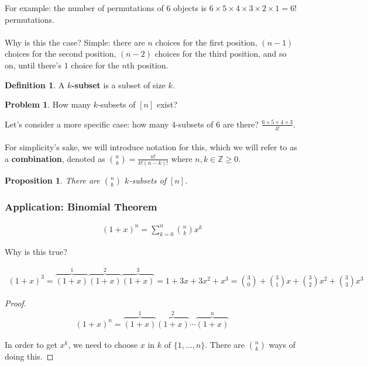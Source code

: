 \documentclass[]{article}
\newtheorem*{proposition}{Proposition}
\theoremstyle{definition}
\newtheorem{problem}{Problem}[section]
\newtheorem*{defn}{Definition}
\newcommand{\lecture}[1]{\marginpar{{\footnotesize $\leftarrow$ \underline{#1}}}}
\begin{document}
				For example: the number of permutations of $6$ objects is $6 \times 5 \times 4 \times 3 \times 2 \times 1 = 6!$ permutations.
				\\ \\
				Why is this the case? Simple: there are $n$ choices for the first position, $(n - 1)$ choices for the second position, $(n - 2)$ choices for the third position, and so on, until there's $1$ choice for the $n$th position.

				\begin{defn}
					A \textbf{$k$-subset} is a subset of size $k$.
				\end{defn}

				\begin{problem}
					How many $k$-subsets of $[n]$ exist?
				\end{problem}

				Let's consider a more specific case: how many 4-subsets of 6 are there? $\frac{6 \times 5 \times 4 \times 3}{4!}$.
				\\ \\
				For simplicity's sake, we will introduce notation for this, which we will refer to as a \textbf{combination}, denoted as 
					${n \choose k} = \frac{n!}{k!(n-k)!}$ where $n, k \in \mathbb{Z} \ge 0$.
				
				\begin{proposition}
					There are ${n \choose k}$ $k$-subsets of $[n]$.
				\end{proposition}
				
				\subsubsection{Application: Binomial Theorem} \lecture{January 9, 2013}
					\begin{align*}
						(1 + x)^n = \sum_{k = 0}^{n} {n \choose k} x^k
					\end{align*}
					
					Why is this true?
					
					\begin{align*}
						(1 + x)^3 = \overbrace{(1 + x)}^1\overbrace{(1 + x)}^2\overbrace{(1 + x)}^3 = 1 + 3x + 3x^2 + x^3 = {3 \choose 0} + {3 \choose 1}x + {3 \choose 2}x^2 + {3 \choose 3}x^3
					\end{align*}
					
					\begin{proof}
						\begin{align*}
							(1 + x)^n = \overbrace{(1 + x)}^1 \overbrace{(1 + x)}^2 \cdots \overbrace{(1 + x)}^n
						\end{align*}
						
						In order to get $x^k$, we need to choose $x$ in $k$ of $\{1, \ldots, n \}$. There are ${n \choose k}$ ways of doing this.
					\end{proof}
		
\end{document}
